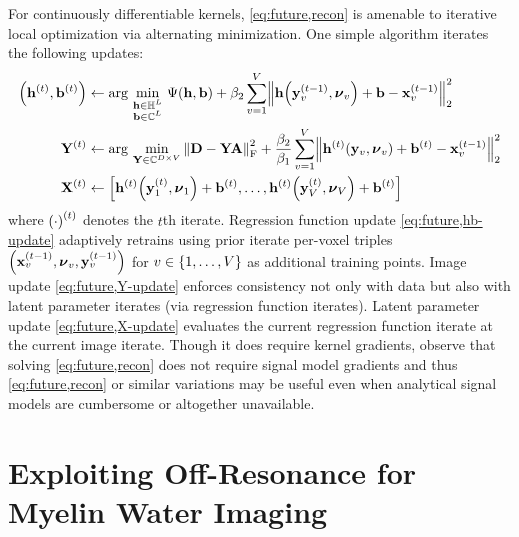 For continuously differentiable kernels,
\eqref{eq:future,recon} is amenable 
to iterative local optimization 
via alternating minimization.
One simple algorithm iterates
the following updates:
\begin{align}
	\paren{\iter{\bmh}{t},\iter{\bmb}{t}} &\gets
		\argmin{%
			\substack{%
				\bmh \in \hilb^L \\
				\bmb \in \complexes{L}
			}%
		}%
		\costa{\bmh,\bmb}	+ \beta_2 \sum_{v=1}^V \norm{%
			\bmh\paren{\iter{\bmy}{t-1}_v,\bmnu_v}+\bmb-\iter{\bmx}{t-1}_v
		}^2_2%
		\label{eq:future,hb-update} 
		\\
	\iter{\bmY}{t} &\gets
		\argmin{%
			\bmY \in \complexes{D \times V}
		}%
		\frob{\bmD-\bmY\bmA}^2 + 
			\frac{\beta_2}{\beta_1} \sum_{v=1}^V \norm{%
				\iter{\bmh}{t}\paren{\bmy_v,\bmnu_v}+\iter{\bmb}{t}-\iter{\bmx}{t-1}_v
			}^2_2%
		\label{eq:future,Y-update}		
		\\
	\iter{\bmX}{t} &\gets
		\brac{%
			\iter{\bmh}{t}\paren{\iter{\bmy}{t}_1,\bmnu_1}+\iter{\bmb}{t},
			\dots,
			\iter{\bmh}{t}\paren{\iter{\bmy}{t}_V,\bmnu_V}+\iter{\bmb}{t}
		}%
		\label{eq:future,X-update}			
\end{align}
where $\iter{\paren{\cdot}}{t}$ denotes the $t$th iterate.
Regression function update \eqref{eq:future,hb-update}
adaptively retrains 
using prior iterate per-voxel triples
$\paren{\iter{\bmx}{t-1}_v,\bmnu_v,\iter{\bmy}{t-1}_v}$
for $v \in \set{1,\dots,V}$
as additional training points.
Image update \eqref{eq:future,Y-update}
enforces consistency 
not only with data
but also with latent parameter iterates
(via regression function iterates).
Latent parameter update \eqref{eq:future,X-update}
evaluates the current regression function iterate
at the current image iterate.
Though it does require kernel gradients,
observe that solving \eqref{eq:future,recon}
does not require signal model gradients
and thus \eqref{eq:future,recon} or similar variations 
may be useful even when analytical signal models
are cumbersome or altogether unavailable.
 
\section{Exploiting Off-Resonance for Myelin Water Imaging}
\label{s,future,off-res}

